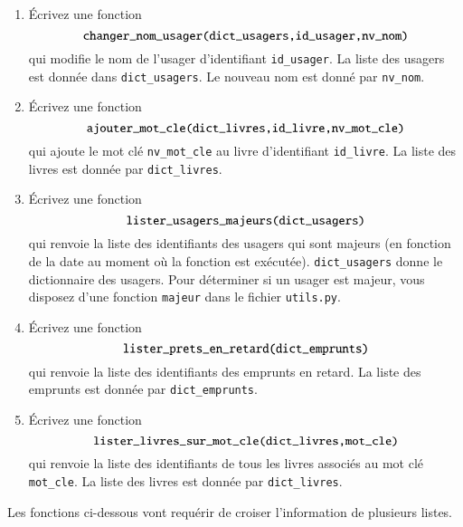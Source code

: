 \documentclass[10pt,a4paper]{sujets-exercices}
\begin{document}
\begin{enumerate}

\item Écrivez une fonction $$\mbox{\texttt{changer\_nom\_usager(dict\_usagers,id\_usager,nv\_nom)}}$$ qui modifie le nom de l'usager d'identifiant \texttt{id\_usager}. La liste des usagers est donnée dans \texttt{dict\_usagers}. Le nouveau nom est donné par \texttt{nv\_nom}.

\item Écrivez une fonction $$\mbox{\texttt{ajouter\_mot\_cle(dict\_livres,id\_livre,nv\_mot\_cle)}}$$ qui ajoute le mot clé \texttt{nv\_mot\_cle} au livre d'identifiant \texttt{id\_livre}. La liste des livres est donnée par \texttt{dict\_livres}.

\item Écrivez une fonction $$\mbox{\texttt{lister\_usagers\_majeurs(dict\_usagers)}}$$ qui renvoie la liste des identifiants des usagers qui sont majeurs (en fonction de la date au moment où la fonction est exécutée). \texttt{dict\_usagers} donne le dictionnaire des usagers. Pour déterminer si un usager est majeur, vous disposez d'une fonction \texttt{majeur} dans le fichier \texttt{utils.py}.

\item Écrivez une fonction $$\mbox{\texttt{lister\_prets\_en\_retard(dict\_emprunts)}}$$ qui renvoie la liste des identifiants des emprunts en retard. La liste des emprunts est donnée par \texttt{dict\_emprunts}.

\item Écrivez une fonction $$\mbox{\texttt{lister\_livres\_sur\_mot\_cle(dict\_livres,mot\_cle)}}$$ qui renvoie la liste des identifiants de tous les livres associés au mot clé \texttt{mot\_cle}. La liste des livres est donnée par \texttt{dict\_livres}.

\end{enumerate}


Les fonctions ci-dessous vont requérir de croiser l'information de plusieurs listes.
\end{document}
